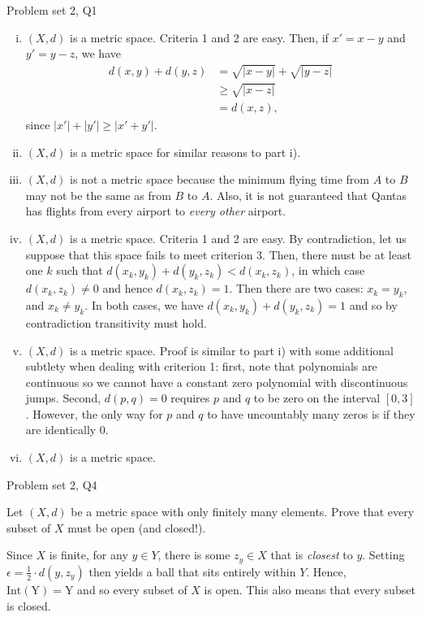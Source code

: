 \begin{problem}{Problem set 2, Q1}{}
    \begin{enumerate}[i)]
        \item $(X, d)$ is a metric space. Criteria 1 and 2 are easy. Then, if $x' = x - y$ and $y' = y - z$, we have
            \begin{align*}
                d(x, y) + d(y, z) &= \sqrt{\lvert x - y \rvert}
                    + \sqrt{\lvert y - z \rvert} \\
                &\geq \sqrt{\lvert x - z \lvert} \\
                &= d(x, z) ,
            \end{align*}
        since $\lvert x' \rvert + \lvert y' \rvert \geq \lvert x' + y' \rvert$.
        \item $(X, d)$ is a metric space for similar reasons to part i).
        \item $(X, d)$ is not a metric space because the minimum flying time from $A$ to $B$ may not be the same as from $B$ to $A$. Also, it is not guaranteed that Qantas has flights from every airport to \textit{every other} airport.
        \item $(X, d)$ is a metric space. Criteria 1 and 2 are easy. By contradiction, let us suppose that this space fails to meet criterion 3. Then, there must be at least one $k$ such that $d(x_k, y_k) + d(y_k, z_k) < d(x_k, z_k)$, in which case $d(x_k, z_k) \neq 0$ and hence $d(x_k, z_k) = 1$. Then there are two cases: $x_k = y_k$, and $x_k \neq y_k$. In both cases, we have $d(x_k, y_k) + d(y_k, z_k) = 1$ and so by contradiction transitivity must hold.
        \item $(X, d)$ is a metric space. Proof is similar to part i) with some additional subtlety when dealing with criterion 1: first, note that polynomials are continuous so we cannot have a constant zero polynomial with discontinuous jumps. Second, $d(p, q) = 0$ requires $p$ and $q$ to be zero on the interval $[0, 3]$. However, the only way for $p$ and $q$ to have uncountably many zeros is if they are identically $0$.
        \item $(X, d)$ is a metric space.
    \end{enumerate}
    
\end{problem}

\begin{problem}{Problem set 2, Q4}{}


    Let $(X, d)$ be a metric space with only finitely many elements. Prove that every subset of $X$ must be open (and closed!).

    \tcblower

    Since $X$ is finite, for any $y \in Y$, there is some $z_y \in X$ that is \textit{closest} to $y$. Setting $\epsilon = \frac{1}{2} \cdot d(y, z_y)$ then yields a ball that sits entirely within $Y$. Hence, $\operatorname{Int(Y) = Y}$ and so every subset of $X$ is open. This also means that every subset is closed.
    
\end{problem}

